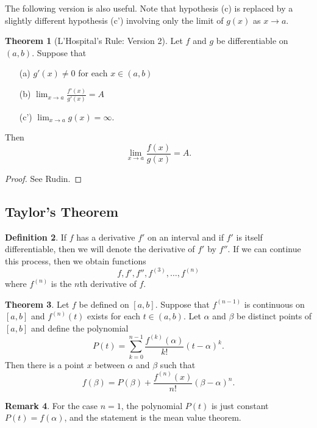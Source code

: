 \documentclass[12pt]{article}
\theoremstyle{definition}
\newtheorem{definition}{Definition}
\newtheorem{remark}[definition]{Remark}
\theoremstyle{theorem}
\newtheorem{theorem}[definition]{Theorem}
\begin{document}
The following version is also useful. Note that hypothesis (c) is replaced by a slightly different hypothesis (c') involving only the limit of $g(x)$ as $x \to a$. 

\begin{theorem}[L'Hospital's Rule: Version 2]
Let $f$ and $g$ be differentiable on $(a,b)$. Suppose that 
\begin{enumerate}
\item[(a)] $g'(x) \ne 0$ for each $x \in (a,b)$
\item[(b)] $\lim_{x \to a} \frac{f'(x)}{g'(x)} = A$
\item[(c')] $\lim_{x \to a}g(x) = \infty$.
\end{enumerate}
Then 
\[
\lim_{x \to a}\frac{f(x)}{g(x)} = A.
\]
\end{theorem}

\begin{proof}
See Rudin. 
\end{proof}

\subsection{Taylor's Theorem}

\begin{definition}
If $f$ has a derivative $f'$ on an interval and if $f'$ is itself differentiable, then we will denote the derivative of $f'$ by $f''$. If we can continue this process, then we obtain functions 
\[
f, f', f'', f^{(3)}, \ldots, f^{(n)}
\]
where $f^{(n)}$ is the $n$th derivative of $f$. 
\end{definition}

\begin{theorem}
Let $f$ be defined on $[a,b]$. Suppose that $f^{(n-1)}$ is continuous on $[a,b]$ and $f^{(n)}(t)$ exists for each $t \in (a,b)$. Let $\alpha$ and $\beta$ be distinct points of $[a,b]$ and define the polynomial 
\[
P(t) = \sum_{k=0}^{n-1} \frac{f^{(k)}(\alpha)}{k!} (t - \alpha)^k.
\]
Then there is a point $x$ between $\alpha$ and $\beta$ such that 
\[
f(\beta) = P(\beta) + \frac{f^{(n)}(x)}{n!}(\beta - \alpha)^n.
\]
\end{theorem}

\begin{remark}
For the case $n = 1$, the polynomial $P(t)$ is just constant $P(t) = f(\alpha)$, and the statement is the mean value theorem. 
\end{remark}
\end{document}

